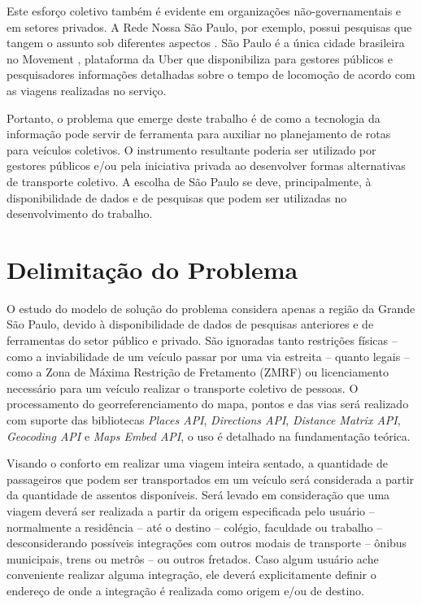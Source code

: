 Este esforço coletivo também é evidente em organizações não-governamentais e em setores privados. A Rede Nossa São Paulo, por exemplo, possui pesquisas que tangem o assunto sob diferentes aspectos \cite{redepq}. São Paulo é a única cidade brasileira no Movement \cite{uberpq}, plataforma da Uber que disponibiliza para gestores públicos e pesquisadores informações detalhadas sobre o tempo de locomoção de acordo com as viagens realizadas no serviço.

Portanto, o problema que emerge deste trabalho é de como a tecnologia da informação pode servir de ferramenta para auxiliar no planejamento de rotas para veículos coletivos. O instrumento resultante poderia ser utilizado por gestores públicos e/ou pela iniciativa privada ao desenvolver formas alternativas de transporte coletivo. A escolha de São Paulo se deve, principalmente, à disponibilidade de dados e de pesquisas que podem ser utilizadas no desenvolvimento do trabalho.


\section{Delimitação do Problema}
O estudo do modelo de solução do problema considera apenas a região da Grande São Paulo, devido à disponibilidade de dados de pesquisas anteriores e de ferramentas do setor público e privado. São ignoradas tanto restrições físicas -- como a inviabilidade de um veículo passar por uma via estreita -- quanto legais -- como a Zona de Máxima Restrição de Fretamento (ZMRF) ou licenciamento necessário para um veículo realizar o transporte coletivo de pessoas. O processamento do georreferenciamento do mapa, pontos e das vias será realizado com suporte das bibliotecas \emph{Places API}, \emph{Directions API}, \emph{Distance Matrix API}, \emph{Geocoding API} e \emph{Maps Embed API}, o uso é detalhado na fundamentação teórica.

Visando o conforto em realizar uma viagem inteira sentado, a quantidade de passageiros que podem ser transportados em um veículo será considerada a partir da quantidade de assentos disponíveis. Será levado em consideração que uma viagem deverá ser realizada a partir da origem especificada pelo usuário -- normalmente a residência -- até o destino -- colégio, faculdade ou trabalho -- desconsiderando possíveis integrações com outros modais de transporte -- ônibus municipais, trens ou metrôs -- ou outros fretados. Caso algum usuário ache conveniente realizar alguma integração, ele deverá explicitamente definir o endereço de onde a integração é realizada como origem e/ou de destino.

